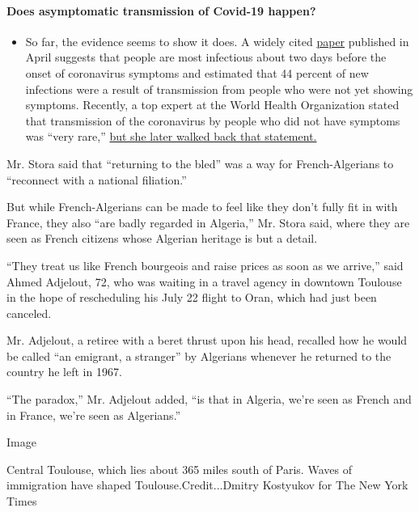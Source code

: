 \begin{itemize}
{  \paragraph{Does asymptomatic transmission of Covid-19
  happen?}\label{does-asymptomatic-transmission-of-covid-19-happen}}

  \begin{itemize}
  \tightlist
  \item
    So far, the evidence seems to show it does. A widely cited
    \href{https://www.nature.com/articles/s41591-020-0869-5}{paper}
    published in April suggests that people are most infectious about
    two days before the onset of coronavirus symptoms and estimated that
    44 percent of new infections were a result of transmission from
    people who were not yet showing symptoms. Recently, a top expert at
    the World Health Organization stated that transmission of the
    coronavirus by people who did not have symptoms was ``very rare,''
    \href{https://www.nytimes.com/2020/06/09/world/coronavirus-updates.html?action=click\&pgtype=Article\&state=default\&region=MAIN_CONTENT_3\&context=storylines_faq\#link-1f302e21}{but
    she later walked back that statement.}
  \end{itemize}
\end{itemize}

Mr. Stora said that ``returning to the bled'' was a way for
French-Algerians to ``reconnect with a national filiation.''

But while French-Algerians can be made to feel like they don't fully fit
in with France, they also ``are badly regarded in Algeria,'' Mr. Stora
said, where they are seen as French citizens whose Algerian heritage is
but a detail.

``They treat us like French bourgeois and raise prices as soon as we
arrive,'' said Ahmed Adjelout, 72, who was waiting in a travel agency in
downtown Toulouse in the hope of rescheduling his July 22 flight to
Oran, which had just been canceled.

Mr. Adjelout, a retiree with a beret thrust upon his head, recalled how
he would be called ``an emigrant, a stranger'' by Algerians whenever he
returned to the country he left in 1967.

``The paradox,'' Mr. Adjelout added, ``is that in Algeria, we're seen as
French and in France, we're seen as Algerians.''

Image

Central Toulouse, which lies about 365 miles south of Paris. Waves of
immigration have shaped Toulouse.Credit...Dmitry Kostyukov for The New
York Times

